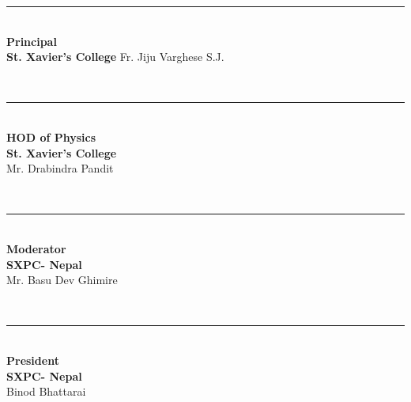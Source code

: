 \documentclass[a4paper,10pt]{article}
\begin{document}
\vspace{2.8cm}

\begin{center}

\begin{minipage}{0.2\textwidth}
\begin{flushleft}
\rule{3.3cm}{0.4pt} \\[0.5cm]
\textbf{Principal}\\
\textbf{St. Xavier's College}
Fr. Jiju Varghese S.J.
\end{flushleft}
\end{minipage}
~
\begin{minipage}{0.2\textwidth}
\begin{flushleft}
\rule{3.3cm}{0.4pt} \\[0.5cm]
\textbf{HOD of Physics}\\
\textbf{St. Xavier's College}\\
Mr. Drabindra Pandit
\end{flushleft}
\end{minipage}
~
\begin{minipage}{0.21\textwidth}
\begin{flushleft}
\rule{3.4cm}{0.4pt} \\[0.5cm]
\textbf{Moderator}\\
\textbf{SXPC- Nepal}\\
Mr. Basu Dev Ghimire
\end{flushleft}
\end{minipage}
~
\begin{minipage}{0.2\textwidth}
\begin{flushleft}
\rule{3cm}{0.4pt} \\[0.5cm]
\textbf{President}\\
\textbf{SXPC- Nepal}\\
Binod Bhattarai
\end{flushleft}
\end{minipage}

\end{center}
\end{document}
